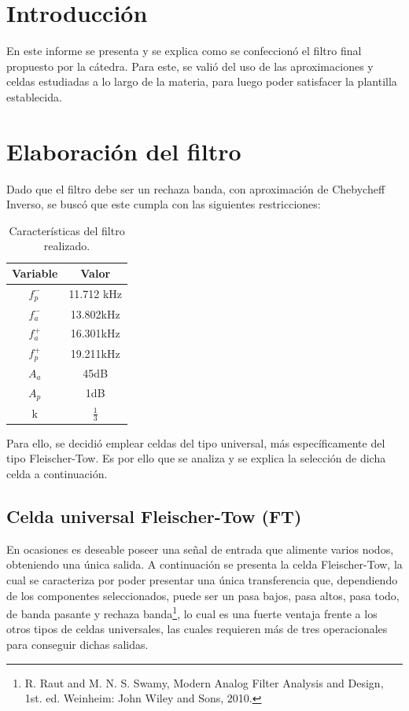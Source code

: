 







\tableofcontents
\newpage


\section{Introducción}
En este informe se presenta y se explica como se confeccionó el filtro final propuesto por la cátedra. Para este, se valió del uso de las aproximaciones y celdas estudiadas a lo largo de la materia, para luego poder satisfacer la plantilla establecida.

\section{Elaboración del filtro}
Dado que el filtro debe ser un rechaza banda, con aproximación de Chebycheff Inverso, se buscó que este cumpla con las siguientes restricciones:
\begin{table}[H]
\centering
\begin{tabular}{cc}
\hline
\textbf{Variable} & \textbf{Valor} \\
\hline
$f_p^-$ & 11.712 kHz   \\ 
$f_a^-$ & 13.802kHz    \\ 
$f_a^+$ & 16.301kHz    \\ 
$f_p^+$ & 19.211kHz    \\ 
$A_a$   & 45dB         \\ 
$A_p$   & 1dB          \\ 
k       & $\frac{1}{3}$ \\ 
\hline
\end{tabular}
\caption{Características del filtro realizado.}
\label{tabla:caracteristicas1}
\end{table}

Para ello, se decidió emplear celdas del tipo universal, más específicamente del tipo Fleischer-Tow. Es por ello que se analiza y se explica la selección de dicha celda a continuación. 

\subsection{Celda universal Fleischer-Tow (FT)}
En ocasiones es deseable poseer una señal de entrada que alimente varios nodos, obteniendo una única salida. A continuación se presenta la celda Fleischer-Tow, la cual se caracteriza por poder presentar una única transferencia que, dependiendo de los componentes seleccionados, puede ser un pasa bajos, pasa altos, pasa todo, de banda pasante y rechaza banda\footnote{R. Raut and M. N. S. Swamy, Modern Analog Filter Analysis and Design, 1st. ed. Weinheim: John Wiley and Sons, 2010.}, lo cual es una fuerte ventaja frente a los otros tipos de celdas universales, las cuales requieren más de tres operacionales para conseguir dichas salidas.

